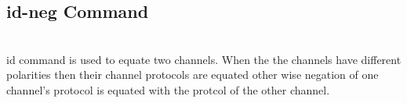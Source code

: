 \documentclass[11pt]{article}
\begin{document}
\subsection {id-neg Command}
~~\\
{\sf id} command is used to equate two channels. When the the channels have different polarities then their channel protocols are equated other wise negation of one channel's protocol is equated with the protcol of the other channel.   
\begin{mdframed} [style=MyFrame,userdefinedwidth=13cm,align=center,
                  frametitle=Typing Rules for id-neg,frametitlerule=true,
                  frametitlerulewidth = 1pt
                 ]
~~\\
  { 
  }~~\\~~\\

  { 
  }~~\\

  { 
  }~~\\

  { 
  }
\end{mdframed}



\newpage
\end{document}
